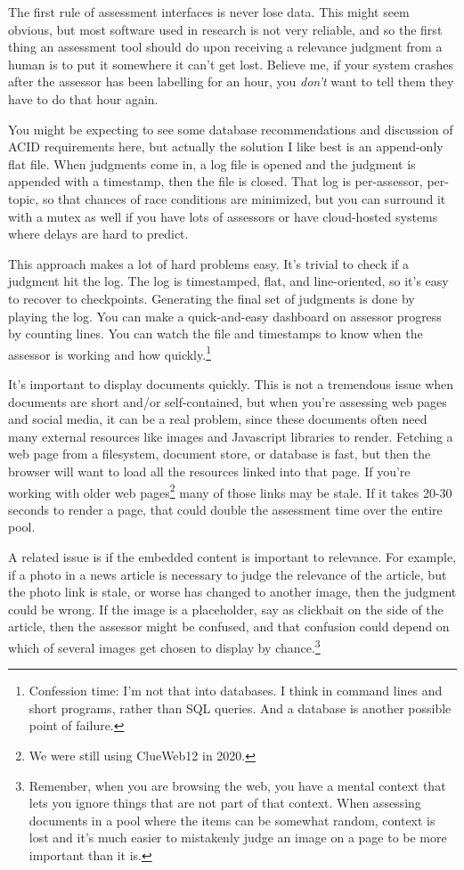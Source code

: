 \documentclass[nobib]{tufte-book}
\begin{document}
The first rule of assessment interfaces is never lose data.  This might seem obvious, but most software used in research is not very reliable, and so the first thing an assessment tool should do upon receiving a relevance judgment from a human is to put it somewhere it can't get lost.  Believe me, if your system crashes after the assessor has been labelling for an hour, you {\em don't} want to tell them they have to do that hour again.

You might be expecting to see some database recommendations and discussion of ACID requirements here, but actually the solution I like best is an append-only flat file. When judgments come in, a log file is opened and the judgment is appended with a timestamp, then the file is closed.  That log is per-assessor, per-topic, so that chances of race conditions are minimized, but you can surround it with a mutex as well if you have lots of assessors or have cloud-hosted systems where delays are hard to predict.  

This approach makes a lot of hard problems easy.  It's trivial to check if a judgment hit the log.  The log is timestamped, flat, and line-oriented, so it's easy to recover to checkpoints.  Generating the final set of judgments is done by playing the log.  You can make a quick-and-easy dashboard on assessor progress by counting lines.  You can watch the file and timestamps to know when the assessor is working and how quickly.\footnote{Confession time: I'm not that into databases. I think in command lines and short programs, rather than SQL queries. And a database is another possible point of failure.}

It's important to display documents quickly.  This is not a tremendous issue when documents are short and/or self-contained, but when you're assessing web pages and social media, it can be a real problem, since these documents often need many external resources like images and Javascript libraries to render.  Fetching a web page from a filesystem, document store, or database is fast, but then the browser will want to load all the resources linked into that page.  If you're working with older web pages\footnote{We were still using ClueWeb12 in 2020.} many of those links may be stale.  If it takes 20-30 seconds to render a page, that could double the assessment time over the entire pool.

A related issue is if the embedded content is important to relevance.  For example, if a photo in a news article is necessary to judge the relevance of the article, but the photo link is stale, or worse has changed to another image, then the judgment could be wrong.  If the image is a placeholder, say as clickbait on the side of the article, then the assessor might be confused, and that confusion could depend on which of several images get chosen to display by chance.\footnote{Remember, when you are browsing the web, you have a mental context that lets you ignore things that are not part of that context.  When assessing documents in a pool where the items can be somewhat random, context is lost and it's much easier to mistakenly judge an image on a page to be more important than it is.}
\end{document}
